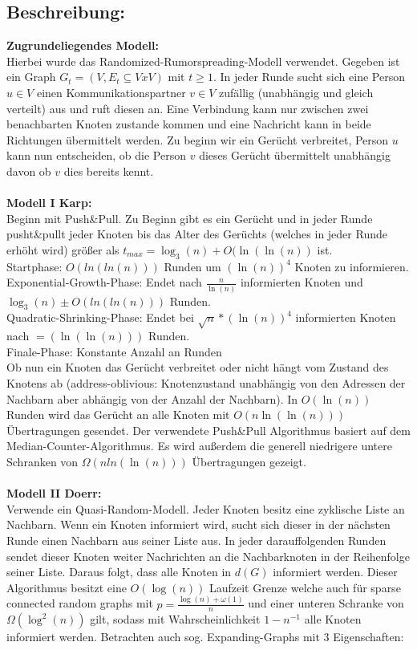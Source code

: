 \documentclass[12pt,a4paper]{report}
\begin{document}
\subsection*{Beschreibung:}
\textbf{Zugrundeliegendes Modell:}\\
 Hierbei wurde das Randomized-Rumorspreading-Modell verwendet. Gegeben ist ein Graph $G_t=(V,E_t \subseteq VxV)$ mit $t \ge 1$. In jeder Runde sucht sich eine Person $u \in V$ einen Kommunikationspartner $v \in V$ zufällig (unabhängig und gleich verteilt) aus und ruft diesen an. Eine Verbindung kann nur zwischen zwei benachbarten Knoten zustande kommen und eine Nachricht kann in beide Richtungen übermittelt werden. Zu beginn wir ein Gerücht verbreitet, Person $u$ kann nun entscheiden, ob die Person $v$ dieses Gerücht übermittelt unabhängig davon ob $v$ dies bereits kennt.\\
\\
\textbf{Modell I Karp:}\\
Beginn mit Push\&Pull. Zu Beginn gibt es ein Gerücht und in jeder Runde pusht\&pullt jeder Knoten bis das Alter des Gerüchts (welches in jeder Runde erhöht wird) größer als $t_{max} = \log_3(n)+O(\ln(\ln(n))$ ist.\\
Startphase: $O(ln(ln(n)))$ Runden um $(\ln(n))^4$ Knoten zu informieren.\\
Exponential-Growth-Phase: Endet nach $\frac{n}{\ln(n)}$ informierten Knoten und\\ $\log_3(n) \pm O(ln(ln(n)))$ Runden.\\
Quadratic-Shrinking-Phase: Endet bei $\sqrt{n}*(\ln(n))^4$ informierten Knoten nach $=(\ln(\ln(n)))$ Runden.\\ 
Finale-Phase: Konstante Anzahl an Runden\\
Ob nun ein Knoten das Gerücht verbreitet oder nicht hängt vom Zustand des Knotens ab (address-oblivious: Knotenzustand unabhängig von den Adressen der Nachbarn aber abhängig von der Anzahl der Nachbarn). In $O(\ln(n))$ Runden wird das Gerücht an alle Knoten mit $O(n\ln(\ln(n)))$ Übertragungen gesendet. Der verwendete Push\&Pull Algorithmus basiert auf dem Median-Counter-Algorithmus. Es wird außerdem die generell niedrigere untere Schranken von $\Omega (n ln(\ln(n)))$ Übertragungen gezeigt.
\\
\\
\textbf{Modell II Doerr:}\\
Verwende ein Quasi-Random-Modell. Jeder Knoten besitz eine zyklische Liste an Nachbarn. Wenn ein Knoten informiert wird, sucht sich dieser in der nächsten Runde einen Nachbarn aus seiner Liste aus. In jeder darauffolgenden Runden sendet dieser Knoten weiter Nachrichten an die Nachbarknoten in der Reihenfolge seiner Liste. Daraus folgt, dass alle Knoten in $d(G)$ informiert werden. Dieser Algorithmus besitzt eine $O(\log(n))$ Laufzeit Grenze welche auch für sparse connected random graphs mit $p=\frac{\log(n)+\omega(1)}{n}$ und einer unteren Schranke von $\Omega(\log^2(n))$ gilt, sodass mit Wahrscheinlichkeit $1-n^{-1}$ alle Knoten informiert werden. Betrachten auch sog. Expanding-Graphs mit 3 Eigenschaften:\\
\end{document}
